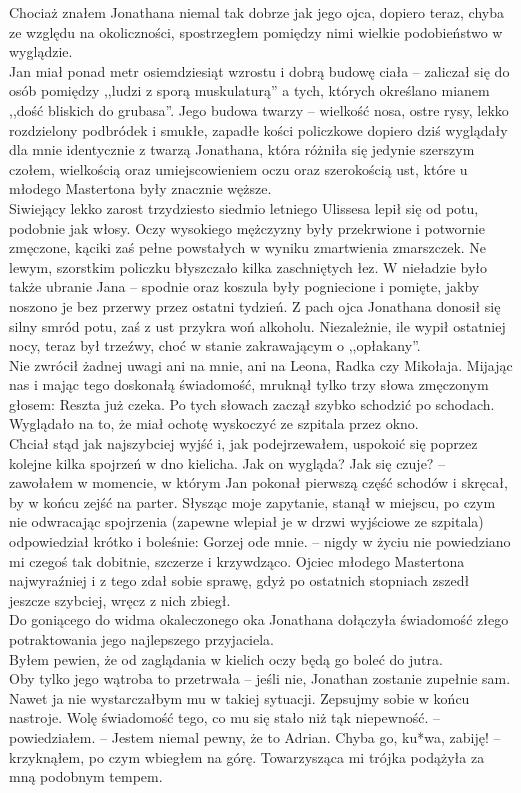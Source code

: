 \documentclass[../MAIN.tex]{subfiles}
\begin{document}
Chociaż znałem Jonathana niemal tak dobrze jak jego ojca, dopiero teraz, chyba ze względu na okoliczności, spostrzegłem pomiędzy nimi wielkie podobieństwo w wyglądzie.\\
Jan miał ponad metr osiemdziesiąt wzrostu i dobrą budowę ciała -- zaliczał się do osób pomiędzy ,,ludzi z sporą muskulaturą'' a tych, których określano mianem ,,dość bliskich do grubasa''.
Jego budowa twarzy -- wielkość nosa, ostre rysy, lekko rozdzielony podbródek i smukłe, zapadłe kości policzkowe dopiero dziś wyglądały dla mnie identycznie z twarzą Jonathana, która różniła się jedynie szerszym czołem, wielkością oraz umiejscowieniem oczu oraz szerokością ust, które u młodego Mastertona były znacznie węższe.\\
Siwiejący lekko zarost trzydziesto siedmio letniego Ulissesa lepił się od potu, podobnie jak włosy. Oczy wysokiego mężczyzny były przekrwione i potwornie zmęczone, kąciki zaś pełne powstałych w wyniku zmartwienia zmarszczek. Ne lewym, szorstkim policzku błyszczało kilka zaschniętych łez.
W nieładzie było także ubranie Jana -- spodnie oraz koszula były pogniecione i pomięte, jakby noszono je bez przerwy przez ostatni tydzień. Z pach ojca Jonathana donosił się silny smród potu, zaś z ust przykra woń alkoholu. Niezależnie, ile wypił ostatniej nocy, teraz był trzeźwy, choć w stanie zakrawającym o ,,opłakany''.\\
Nie zwrócił żadnej uwagi ani na mnie, ani na Leona, Radka czy Mikołaja. Mijając nas i mając tego doskonałą świadomość, mruknął tylko trzy słowa zmęczonym głosem:
\sx Reszta już czeka.
\qd
Po tych słowach zaczął szybko schodzić po schodach. Wyglądało na to, że miał ochotę wyskoczyć ze szpitala przez okno.\\
Chciał stąd jak najszybciej wyjść i, jak podejrzewałem, uspokoić się poprzez kolejne kilka spojrzeń w dno kielicha.
\sx Jak on wygląda? Jak się czuje? -- zawołałem w momencie, w którym Jan pokonał pierwszą część schodów i skręcał, by w końcu zejść na parter.
\qd
Słysząc moje zapytanie, stanął w miejscu, po czym nie odwracając spojrzenia (zapewne wlepiał je w drzwi wyjściowe ze szpitala) odpowiedział krótko i boleśnie:
\sx Gorzej ode mnie. -- nigdy w życiu nie powiedziano mi czegoś tak dobitnie, szczerze i krzywdząco. 
\qd
Ojciec młodego Mastertona najwyraźniej i z tego zdał sobie sprawę, gdyż po ostatnich stopniach zszedł jeszcze szybciej, wręcz z nich zbiegł.\\
Do goniącego do widma okaleczonego oka Jonathana dołączyła świadomość złego potraktowania jego najlepszego przyjaciela.\\
Byłem pewien, że od zaglądania w kielich oczy będą go boleć do jutra.\\
Oby tylko jego wątroba to przetrwała -- jeśli nie, Jonathan zostanie zupełnie sam.\\
Nawet ja nie wystarczałbym mu w takiej sytuacji.
\sx Zepsujmy sobie w końcu nastroje. Wolę świadomość tego, co mu się stało niż tą\3k niepewność. -- powiedziałem. -- Jestem niemal pewny, że to Adrian. Chyba go, ku*wa, zabiję! -- krzyknąłem, po czym wbiegłem na górę. 
\qd
Towarzysząca mi trójka podążyła za mną podobnym tempem.
\end{document}
